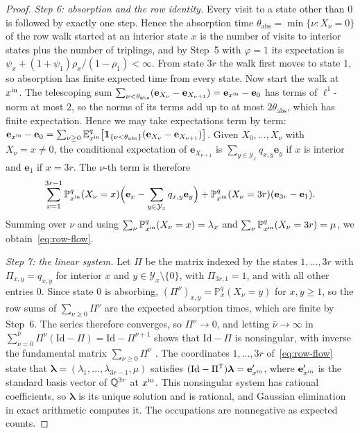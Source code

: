 \begin{proof}
\emph{Step 6: absorption and the row identity.} Every visit to a state
other than \(0\) is followed by exactly one step. Hence the absorption
time \(\theta_{\mathrm{abs}}=\min\{\nu:X_\nu=0\}\) of the row walk
started at an interior state \(x\) is the number of visits to interior
states plus the number of triplings, and by Step~5 with \(\varphi=1\) its
expectation is \(\psi_x+(1+\psi_1)\rho_x/(1-\rho_1)<\infty\). From state
\(3r\) the walk first moves to state \(1\), so absorption has finite
expected time from every state. Now start the walk at \(x^{\mathrm{in}}\). The
telescoping sum
\(\sum_{\nu<\theta_{\mathrm{abs}}}(\mathbf e_{X_\nu}-\mathbf e_{X_{\nu+1}})
=\mathbf e_{x^{\mathrm{in}}}-\mathbf e_0\) has terms of \(\ell^1\)-norm at most
\(2\), so the norms of its terms add up to at most
\(2\theta_{\mathrm{abs}}\), which has finite expectation. Hence we may
take expectations term by term:
\(\mathbf e_{x^{\mathrm{in}}}-\mathbf e_0=\sum_{\nu\ge0}\mathbb E^q_{x^{\mathrm{in}}}
\bigl[\mathbf 1_{\{\nu<\theta_{\mathrm{abs}}\}}(\mathbf e_{X_\nu}-\mathbf e_{X_{\nu+1}})\bigr]\).
Given \(X_0,\ldots,X_\nu\) with \(X_\nu=x\ne0\), the conditional
expectation of \(\mathbf e_{X_{\nu+1}}\) is
\(\sum_{y\in\mathcal Y_x}q_{x,y}\mathbf e_y\) if \(x\) is interior and
\(\mathbf e_1\) if \(x=3r\). The \(\nu\)-th term is therefore
\[
 \sum_{x=1}^{3r-1}\mathbb P^q_{x^{\mathrm{in}}}(X_\nu=x)
 \Bigl(\mathbf e_x-\sum_{y\in\mathcal Y_x}q_{x,y}\mathbf e_y\Bigr)
 +\mathbb P^q_{x^{\mathrm{in}}}(X_\nu=3r)(\mathbf e_{3r}-\mathbf e_1).
\]
Summing over \(\nu\) and using
\(\sum_\nu\mathbb P^q_{x^{\mathrm{in}}}(X_\nu=x)=\lambda_x\) and
\(\sum_\nu\mathbb P^q_{x^{\mathrm{in}}}(X_\nu=3r)=\mu\), we
obtain~\eqref{eq:row-flow}.

\emph{Step 7: the linear system.} Let \(\Pi\) be the matrix indexed by
the states \(1,\ldots,3r\) with \(\Pi_{x,y}=q_{x,y}\) for interior \(x\)
and \(y\in\mathcal Y_x\setminus\{0\}\), with \(\Pi_{3r,1}=1\), and with
all other entries \(0\). Since state \(0\) is absorbing,
\((\Pi^\nu)_{x,y}=\mathbb P^q_x(X_\nu=y)\) for \(x,y\ge1\), so the row
sums of \(\sum_{\nu\ge0}\Pi^\nu\) are the expected absorption times,
which are finite by Step~6. The series therefore converges, so
\(\Pi^\nu\to0\), and letting \(\bar\nu\to\infty\) in
\(\sum_{\nu=0}^{\bar\nu}\Pi^\nu(\mathrm{Id}-\Pi)=\mathrm{Id}-\Pi^{\bar\nu+1}\)
shows that \(\mathrm{Id}-\Pi\) is nonsingular, with inverse the
fundamental matrix \(\sum_{\nu\ge0}\Pi^\nu\)
\citep[Theorem~11.4]{GrinsteadSnell97}.
The coordinates \(1,\ldots,3r\) of~\eqref{eq:row-flow} state that
\(\boldsymbol\lambda=(\lambda_1,\ldots,\lambda_{3r-1},\mu)\) satisfies
\((\mathrm{Id}-\Pi^{\mathsf T})\boldsymbol\lambda=\mathbf e'_{x^{\mathrm{in}}}\),
where \(\mathbf e'_{x^{\mathrm{in}}}\) is the standard basis vector of \(\mathbb Q^{3r}\)
at \(x^{\mathrm{in}}\). This nonsingular system has rational coefficients, so
\(\boldsymbol\lambda\) is its unique solution and is rational, and
Gaussian elimination in exact arithmetic computes it. The occupations are
nonnegative as expected counts.


\end{proof}
